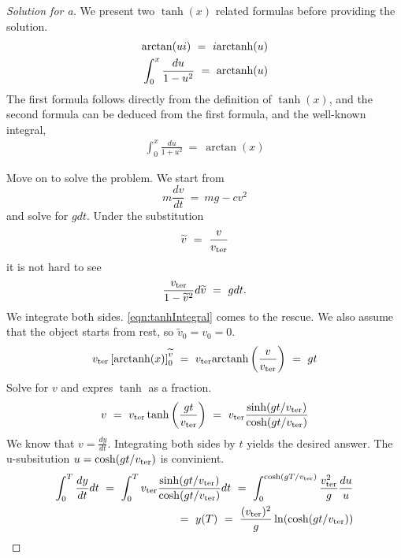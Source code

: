 \documentclass{article}
\numberwithin{equation}{section}
\begin{document}
\begin{proof}[Solution for a]
    We present two $\tanh(x)$ related formulas before providing the solution. 
    \begin{eqnarray}\label{eqn:tanhIntegral}
        \arctan(ui)  \ = \ i \textnormal{arctanh}(u) \nonumber\\ 
        \int_{0}^x \frac {du}{1 - u^2} \ = \ \textnormal{arctanh}(u) 
    \end{eqnarray}
    The first formula follows directly from the definition of 
    $\tanh(x)$, and the second formula can be deduced from the first 
    formula, and the well-known integral, 
    \begin{eqnarray}
        \int_0^x \frac {du}{1 + u^2} \ = \ \arctan(x) 
    \end{eqnarray}

    Move on to solve the problem. We start from 
    \begin{equation}
        m \frac {dv}{dt} \ = \ mg - cv^2
    \end{equation}
    and solve for $gdt$. Under the substitution 
    \begin{eqnarray}
        \widetilde v \ = \ \frac v {v_{\rm ter}}
    \end{eqnarray}
    it is not hard to see 
    \begin{eqnarray}
        \frac {v_{\rm ter} }{
            1 - \widetilde v^2
        } d \widetilde v\ = \ gdt.
    \end{eqnarray}
    We integrate both sides. \eqref{eqn:tanhIntegral} comes to the rescue. 
    We also assume that the object starts from rest, so $\widetilde v_0 = v_0 = 0$. 
    \begin{eqnarray}
        v_{\rm ter} \left[
            \textnormal{arctanh}(x)
        \right]_{0}^{\widetilde v} \ = \ 
        v_{\rm ter} \textnormal{arctanh}\left(
            \frac v {v_{\rm ter}}
        \right) \ = \ gt
    \end{eqnarray}
    Solve for $v$ and expres $\tanh$ as a fraction. 
    \begin{eqnarray}
        v \ = \ v_{\rm ter} \tanh \left(
            \frac {gt} {v_{\rm ter}}
        \right)
        \ = \ 
        v_{\rm ter} \frac{
            \sinh(gt/v_{\rm ter}) 
        }{
            \cosh(gt/v_{\rm ter})
        }
    \end{eqnarray}
    We know that $v = \frac {dy}{dt}$. Integrating both sides 
    by $t$ yields the desired answer. The u-subsitution $u = \cosh(gt/v_{\rm ter})$
    is convinient. 
    \begin{eqnarray}
        \int_0^T \frac {dy}{dt} dt \ = \ 
        \int_0^T 
        v_{\rm ter} \frac{
            \sinh(gt/v_{\rm ter}) 
        }{
            \cosh(gt/v_{\rm ter})
        }dt \ = \ 
        \int_0^{\cosh(gT/v_{\rm ter})} \frac {v_{\rm ter}^2} g \frac {du} u
         \nonumber \\ 
        \ = \ y(T) \ = \  \frac {(v_{\rm ter})^2} g \ln (\cosh(gt/v_{\rm ter}))
    \end{eqnarray}
\end{proof}
\end{document}
